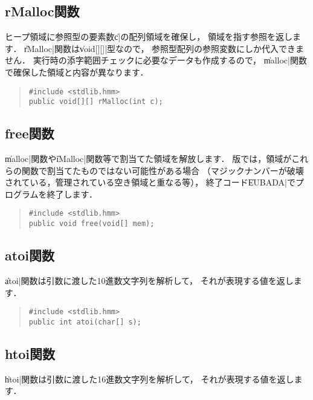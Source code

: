 \subsection{rMalloc関数}

ヒープ領域に参照型の要素数\|c|の配列領域を確保し，
領域を指す参照を返します．
\|rMalloc|関数は\|void[][]|型なので，
参照型配列の参照変数にしか代入できません．
実行時の添字範囲チェックに必要なデータも作成するので，
\|malloc|関数で確保した領域と内容が異なります．

\begin{quote}
\begin{verbatim}
#include <stdlib.hmm>
public void[][] rMalloc(int c);
\end{verbatim}
\end{quote}

\subsection{free関数}

\|malloc|関数や\|iMalloc|関数等で割当てた領域を解放します．
{\tacos}版では，領域がこれらの関数で割当てたものではない可能性がある場合
（マジックナンバーが破壊されている，管理されている空き領域と重なる等），
終了コード\|EUBADA|でプログラムを終了します．

\begin{quote}
\begin{verbatim}
#include <stdlib.hmm>
public void free(void[] mem);
\end{verbatim}
\end{quote}

\subsection{atoi関数}

\|atoi|関数は引数に渡した10進数文字列を解析して，
それが表現する値を返します．

\begin{quote}
\begin{verbatim}
#include <stdlib.hmm>
public int atoi(char[] s);
\end{verbatim}
\end{quote}

\subsection{htoi関数}

\|htoi|関数は引数に渡した16進数文字列を解析して，
それが表現する値を返します．

